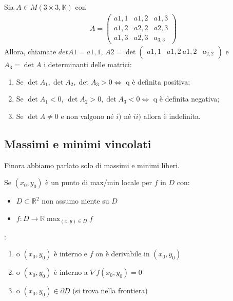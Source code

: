 \documentclass[a4paper, oneside]{article}
\begin{document}
        \begin{theorem}
            Sia $A \in M(3 \times 3, \mathbb{K})$ con
            \begin{gather*}
                A= \begin{pmatrix}
                    a{1, 1} & a{1, 2} & a{1, 3} \\
                    a{1, 2} & a{2, 2} & a{2, 3} \\
                    a{1, 3} & a{2, 3} & a_{3, 3}
                \end{pmatrix}
            \end{gather*}
            Allora, chiamate $det A1 = a{1, 1}$, $A2 = \det \begin{pmatrix}
                a{1, 1} & a{1, 2} \
                a{1, 2} & a_{2, 2}
            \end{pmatrix}$ e $A_3 = \det A$ i determinanti delle matrici:
            \begin{enumerate}[$i)$]
                \item Se $\det A_1, \det A_2, \det A_3 > 0 \Longleftrightarrow $ q è definita positiva;
                \item Se $\det A_1 < 0$, $\det A_2 > 0, \det A_3 < 0 \Longleftrightarrow $ q è definita negativa;
                \item Se $\det A \neq 0$ e non valgono né $i)$ né $ii)$ allora è indefinita.
            \end{enumerate}
        \end{theorem}



        
        \subsection{Massimi e minimi vincolati}


        Finora abbiamo parlato solo di massimi e minimi liberi.\\
        \begin{theorem}
            Se $(x_0,y_0)$ è un punto di max/min locale per $f$ in $D$ con:
            \begin{itemize}
                \item $D \subset \mathbb{R}^2$ non assumo niente su $D$
                \item $f:D \to \mathbb{R} \max_{(x,y) \in D} f$
            \end{itemize}
            :
            \begin{enumerate}[$i)$]
                \item o $(x_0,y_0)$ è interno e $f$ on è derivabile in $(x_0,y_0)$
                \item o $(x_0,y_0)$ è interno a $\nabla f (x_0,y_0) = 0$
                \item o $(x_0,y_0) \in \partial D$ (si trova nella frontiera)  
            \end{enumerate}
        \end{theorem}
\end{document}
